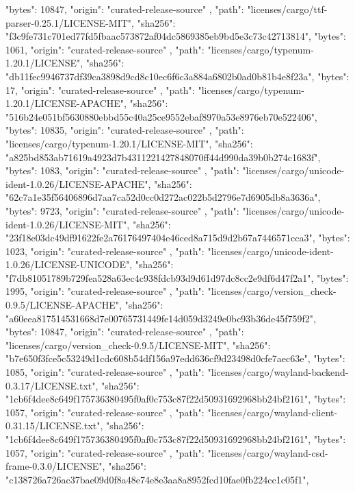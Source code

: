 {{      "bytes": 10847,
      "origin": "curated-release-source"
    },
    {
      "path": "licenses/cargo/ttf-parser-0.25.1/LICENSE-MIT",
      "sha256": "f3c9fe731c701ed77fd5fbaac573872af04dc5869385eb9bd5e3c73c42713814",
      "bytes": 1061,
      "origin": "curated-release-source"
    },
    {
      "path": "licenses/cargo/typenum-1.20.1/LICENSE",
      "sha256": "db11fec9946737df39ca3898d9cd8c10ec6f6c3a884a6802b0ad0b81b4e8f23a",
      "bytes": 17,
      "origin": "curated-release-source"
    },
    {
      "path": "licenses/cargo/typenum-1.20.1/LICENSE-APACHE",
      "sha256": "516b24e051bf5630880ebbd55c40a25ce9552ebaf8970a53e8976eb70e522406",
      "bytes": 10835,
      "origin": "curated-release-source"
    },
    {
      "path": "licenses/cargo/typenum-1.20.1/LICENSE-MIT",
      "sha256": "a825bd853ab71619a4923d7b4311221427848070ff44d990da39b0b274c1683f",
      "bytes": 1083,
      "origin": "curated-release-source"
    },
    {
      "path": "licenses/cargo/unicode-ident-1.0.26/LICENSE-APACHE",
      "sha256": "62c7a1e35f56406896d7aa7ca52d0cc0d272ac022b5d2796e7d6905db8a3636a",
      "bytes": 9723,
      "origin": "curated-release-source"
    },
    {
      "path": "licenses/cargo/unicode-ident-1.0.26/LICENSE-MIT",
      "sha256": "23f18e03dc49df91622fe2a76176497404e46ced8a715d9d2b67a7446571cca3",
      "bytes": 1023,
      "origin": "curated-release-source"
    },
    {
      "path": "licenses/cargo/unicode-ident-1.0.26/LICENSE-UNICODE",
      "sha256": "f7db81051789b729fea528a63ec4c938fdcb93d9d61d97dc8cc2e9df6d47f2a1",
      "bytes": 1995,
      "origin": "curated-release-source"
    },
    {
      "path": "licenses/cargo/version_check-0.9.5/LICENSE-APACHE",
      "sha256": "a60eea817514531668d7e00765731449fe14d059d3249e0bc93b36de45f759f2",
      "bytes": 10847,
      "origin": "curated-release-source"
    },
    {
      "path": "licenses/cargo/version_check-0.9.5/LICENSE-MIT",
      "sha256": "b7e650f3fce5c53249d1cdc608b54df156a97edd636cf9d23498d0cfe7aec63e",
      "bytes": 1085,
      "origin": "curated-release-source"
    },
    {
      "path": "licenses/cargo/wayland-backend-0.3.17/LICENSE.txt",
      "sha256": "1cb6f4dee8c649f175736380495f0af0c753c87f22d50931692968bb24bf2161",
      "bytes": 1057,
      "origin": "curated-release-source"
    },
    {
      "path": "licenses/cargo/wayland-client-0.31.15/LICENSE.txt",
      "sha256": "1cb6f4dee8c649f175736380495f0af0c753c87f22d50931692968bb24bf2161",
      "bytes": 1057,
      "origin": "curated-release-source"
    },
    {
      "path": "licenses/cargo/wayland-csd-frame-0.3.0/LICENSE",
      "sha256": "c138726a726ac37bae09d0f8a48e74e8e3aa8a8952fcd10fae0fb224cc1c05f1",
}}
